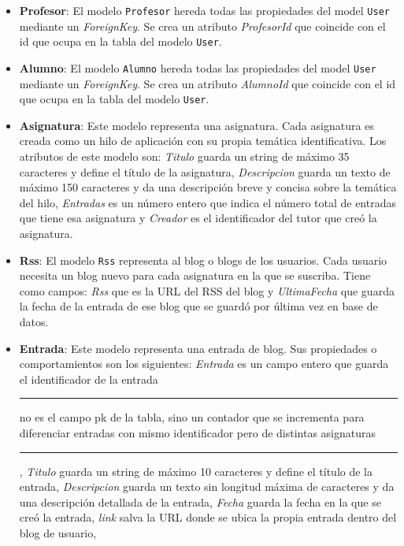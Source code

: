 \documentclass[a4paper, 12pt]{book}
\begin{document}
\begin{itemize}
  \texttt{User} contendr\'a todos los usuarios de aplicaci\'on previamente registrados, y ninguno de \'estos podr\'a coincidir con otro en nombre de usuario
  puesto que en la p\'agina de registro se aplica un filtro al introducir el dato \textit{Username}.
  \item {\bfseries Profesor}: El modelo \texttt{Profesor} hereda todas las propiedades del model \texttt{User} mediante un \textit{ForeignKey}. Se crea un
  atributo \textit{ProfesorId} que coincide con el id que ocupa en la tabla del modelo \texttt{User}.
  \item {\bfseries Alumno}: El modelo \texttt{Alumno} hereda todas las propiedades del model \texttt{User} mediante un \textit{ForeignKey}. Se crea un
  atributo \textit{AlumnoId} que coincide con el id que ocupa en la tabla del modelo \texttt{User}.
  \item {\bfseries Asignatura}: Este modelo representa una asignatura. Cada asignatura es creada como un hilo de aplicaci\'on con su propia tem\'atica
  identificativa. Los atributos de este modelo son: \textit{Titulo} guarda un string de m\'aximo 35 caracteres y define el t\'itulo de la asignatura, 
  \textit{Descripcion} guarda un texto de m\'aximo 150 caracteres y da una descripci\'on breve y concisa sobre la tem\'atica del hilo, \textit{Entradas} 
  es un n\'umero entero que indica el n\'umero total de entradas que tiene esa asignatura y \textit{Creador} es el identificador del tutor que cre\'o la
  asignatura.
  \item {\bfseries Rss}: El modelo \texttt{Rss} representa al blog o blogs de los usuarios. Cada usuario necesita un blog nuevo para cada asignatura en la
  que se suscriba. Tiene como campos: \textit{Rss} que es la URL del RSS del blog y \textit{UltimaFecha} que guarda la fecha de la entrada de ese blog 
  que se guard\'o por \'ultima vez en base de datos.
  \item {\bfseries Entrada}: Este modelo representa una entrada de blog. Sus propiedades o comportamientos son los siguientes: \textit{Entrada} es un campo 
  entero que guarda el identificador de la entrada \rule[1mm]{4mm}{0.1mm}no es el campo pk de la tabla, sino un contador que se incrementa para diferenciar
  entradas con mismo identificador pero de distintas asignaturas\rule[1mm]{4mm}{0.1mm}, \textit{Titulo} guarda un string de m\'aximo 10 caracteres y define 
  el t\'itulo de la entrada, \textit{Descripcion} guarda un texto sin longitud m\'axima de caracteres y da una descripci\'on detallada de la entrada,
  \textit{Fecha} guarda la fecha en la que se cre\'o la entrada, \textit{link} salva la URL donde se ubica la propia entrada dentro del blog de usuario, 

\end{itemize}
\end{document}
